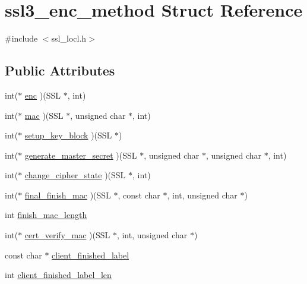 \hypertarget{structssl3__enc__method}{\section{ssl3\-\_\-enc\-\_\-method Struct Reference}
\label{structssl3__enc__method}
}


{\ttfamily \#include $<$ssl\-\_\-locl.\-h$>$}

\subsection*{Public Attributes}
\begin{DoxyCompactItemize}
\item 
int($\ast$ \hyperlink{structssl3__enc__method_a6793e5dd277dbc19ef08380031c751b8}{enc} )(S\-S\-L $\ast$, int)
\item 
int($\ast$ \hyperlink{structssl3__enc__method_acb78dd4b89469772b680df62569d9382}{mac} )(S\-S\-L $\ast$, unsigned char $\ast$, int)
\item 
int($\ast$ \hyperlink{structssl3__enc__method_a53f84a2dc07948ff4b082a7824080f3f}{setup\-\_\-key\-\_\-block} )(S\-S\-L $\ast$)
\item 
int($\ast$ \hyperlink{structssl3__enc__method_a5c06552bd6fce1efdcab90cc2fdb6d3b}{generate\-\_\-master\-\_\-secret} )(S\-S\-L $\ast$, unsigned char $\ast$, unsigned char $\ast$, int)
\item 
int($\ast$ \hyperlink{structssl3__enc__method_a29246e7e0dc5501e0f2aab7a2dac2b1a}{change\-\_\-cipher\-\_\-state} )(S\-S\-L $\ast$, int)
\item 
int($\ast$ \hyperlink{structssl3__enc__method_a279f059ffb51e79681dcc220967ac52f}{final\-\_\-finish\-\_\-mac} )(S\-S\-L $\ast$, const char $\ast$, int, unsigned char $\ast$)
\item 
int \hyperlink{structssl3__enc__method_a936196b1d38258a1103b0813440a31b2}{finish\-\_\-mac\-\_\-length}
\item 
int($\ast$ \hyperlink{structssl3__enc__method_a2a6053ae07f8281fb69133e2cefcdfee}{cert\-\_\-verify\-\_\-mac} )(S\-S\-L $\ast$, int, unsigned char $\ast$)
\item 
const char $\ast$ \hyperlink{structssl3__enc__method_a87df6867ae53bc91ec4c499762e1d33b}{client\-\_\-finished\-\_\-label}
\item 
int \hyperlink{structssl3__enc__method_a5d7e0116e96a09669eb0afa28f5aa70a}{client\-\_\-finished\-\_\-label\-\_\-len}
\item 

\end{DoxyCompactItemize}
